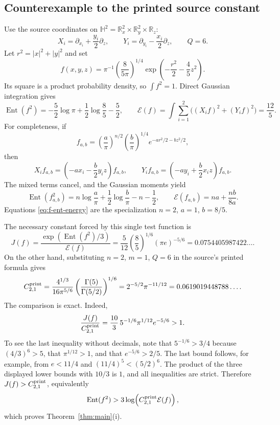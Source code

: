 \documentclass[11pt]{article}
\newcommand{\HH}{\mathbb H}
\newcommand{\R}{\mathbb R}
\newcommand{\Ent}{\operatorname{Ent}}
\newcommand{\E}{\mathcal E}
\begin{document}
\subsection{Counterexample to the printed source constant}

Use the source coordinates on $\HH^2=\R^2_x\times\R^2_y\times\R_z$:
\[
 X_i=\partial_{x_i}+\frac{y_i}{2}\partial_z,
 \qquad
 Y_i=\partial_{y_i}-\frac{x_i}{2}\partial_z,
 \qquad Q=6.
\]
Let $r^2=|x|^2+|y|^2$ and set
\begin{equation}\label{eq:f}
 f(x,y,z)=\pi^{-1}\left(\frac8{5\pi}\right)^{1/4}
 \exp\!\left(-\frac{r^2}{2}-\frac45z^2\right).
\end{equation}
Its square is a product probability density, so $\int f^2=1$.  Direct
Gaussian integration gives
\begin{equation}\label{eq:f-ent-energy}
 \Ent(f^2)=-\frac52\log\pi+\frac12\log\frac85-\frac52,
 \qquad
 \E(f)=\int\sum_{i=1}^2\bigl((X_if)^2+(Y_if)^2\bigr)=\frac{12}{5}.
\end{equation}
For completeness, if
\[
 f_{a,b}=\left(\frac a\pi\right)^{n/2}
 \left(\frac b\pi\right)^{1/4}
 e^{-a r^2/2-bz^2/2},
\]
then
\[
 X_if_{a,b}=\left(-ax_i-\frac b2y_iz\right)f_{a,b},\qquad
 Y_if_{a,b}=\left(-ay_i+\frac b2x_iz\right)f_{a,b}.
\]
The mixed terms cancel, and the Gaussian moments yield
\[
 \Ent(f_{a,b}^2)=n\log\frac a\pi+\frac12\log\frac b\pi-n-\frac12,
 \qquad
 \E(f_{a,b})=na+\frac{nb}{8a}.
\]
Equations \eqref{eq:f-ent-energy} are the specialization $n=2$, $a=1$,
$b=8/5$.

The necessary constant forced by this single test function is
\begin{equation}\label{eq:jf}
 J(f)=\frac{\exp(\Ent(f^2)/3)}{\E(f)}
 =\frac5{12}\left(\frac85\right)^{1/6}(\pi e)^{-5/6}
 =0.0754405987422\ldots .
\end{equation}
On the other hand, substituting $n=2$, $m=1$, $Q=6$ in the source's printed
formula gives
\begin{equation}\label{eq:cprint}
 C^{\rm print}_{2,1}
 =\frac{4^{1/3}}{16\pi^{5/6}}
 \left(\frac{\Gamma(5)}{\Gamma(5/2)}\right)^{1/6}
 =2^{-5/2}\pi^{-11/12}
 =0.0619019448788\ldots .
\end{equation}
The comparison is exact.  Indeed,
\begin{equation}\label{eq:ratio-one}
 \frac{J(f)}{C^{\rm print}_{2,1}}
 =\frac{10}{3}\,5^{-1/6}\pi^{1/12}e^{-5/6}>1.
\end{equation}
To see the last inequality without decimals, note that
$5^{-1/6}>3/4$ because $(4/3)^6>5$, that $\pi^{1/12}>1$, and that
$e^{-5/6}>2/5$.  The last bound follows, for example, from
$e<11/4$ and $(11/4)^5<(5/2)^6$.  The product of the three displayed lower
bounds with $10/3$ is $1$, and all inequalities are strict.  Therefore
$J(f)>C^{\rm print}_{2,1}$, equivalently
\[
 \Ent(f^2)>3\log\!\left(C^{\rm print}_{2,1}\E(f)\right),
\]
which proves Theorem~\ref{thm:main}(i).
\end{document}
